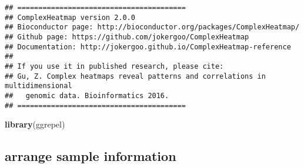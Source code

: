 \documentclass[]{article}
\newenvironment{Shaded}{\begin{snugshade}}{\end{snugshade}}
\newcommand{\ControlFlowTok}[1]{\textcolor[rgb]{0.13,0.29,0.53}{\textbf{#1}}}
\newcommand{\DataTypeTok}[1]{\textcolor[rgb]{0.13,0.29,0.53}{#1}}
\newcommand{\DecValTok}[1]{\textcolor[rgb]{0.00,0.00,0.81}{#1}}
\newcommand{\KeywordTok}[1]{\textcolor[rgb]{0.13,0.29,0.53}{\textbf{#1}}}
\newcommand{\NormalTok}[1]{#1}
\newcommand{\OperatorTok}[1]{\textcolor[rgb]{0.81,0.36,0.00}{\textbf{#1}}}
\newcommand{\StringTok}[1]{\textcolor[rgb]{0.31,0.60,0.02}{#1}}
\begin{document}
\begin{verbatim}
## ========================================
## ComplexHeatmap version 2.0.0
## Bioconductor page: http://bioconductor.org/packages/ComplexHeatmap/
## Github page: https://github.com/jokergoo/ComplexHeatmap
## Documentation: http://jokergoo.github.io/ComplexHeatmap-reference
## 
## If you use it in published research, please cite:
## Gu, Z. Complex heatmaps reveal patterns and correlations in multidimensional 
##   genomic data. Bioinformatics 2016.
## ========================================
\end{verbatim}

\begin{Shaded}
\begin{Highlighting}[]
\KeywordTok{library}\NormalTok{(ggrepel)}
\end{Highlighting}
\end{Shaded}

\hypertarget{arrange-sample-information}{%
\subsection{arrange sample
information}\label{arrange-sample-information}}

\begin{Shaded}
\end{Shaded}
\end{document}
